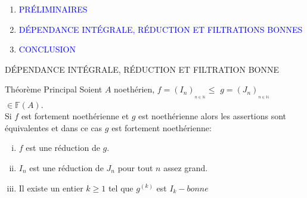 \documentclass[11pt,a4paper]{beamer}
\begin{document}
	
	
	
	\begin{frame}
		\begin{enumerate}
			\item<0> \textcolor{blue}{PRÉLIMINAIRES}\\
			\item<1> \textcolor{blue}{DÉPENDANCE INTÉGRALE, RÉDUCTION ET FILTRATIONS BONNES }\\
			\item<0> \textcolor{blue}{CONCLUSION}\\
		\end{enumerate}
	\end{frame}
	
	\begin{frame}{DÉPENDANCE INTÉGRALE, RÉDUCTION ET FILTRATION BONNE}
		\begin{block}{Théorème Principal}
			Soient $A$ noethérien, $f=(I_{n})_{_{n\in \mathbb{N}}}\leq $ $g=(J_{n})_{_{n\in \mathbb{N}}}$ $ \in \mathbb{F}(A).$ \\ Si $f$ est fortement noethérienne et $g$ est noethérienne alors les assertions sont équivalentes et dans ce cas $g$ est fortement noethérienne:
			\begin{enumerate}[(i)]
				\item $f$ est une réduction de $g.$
				\item $I_{n}$ est une réduction de $J_{n}$ pour tout $n$ assez grand.
				\item Il existe un entier $k\geq 1$ tel que $g^{(k)}$ est $I_{k}-bonne$
			\end{enumerate}
		\end{block}
	\end{frame}
	
\end{document}
